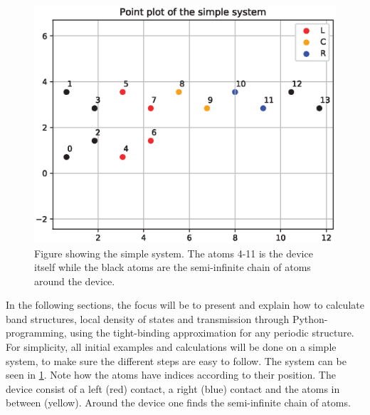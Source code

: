 \begin{figure}
	\vspace{-2em}
	\includegraphics[width=.45\textwidth]{Figures/pointplot.eps}
	\caption{Figure showing the simple system. The atoms 4-11 is the device itself while the black atoms are the semi-infinite chain of atoms around the device.}\label{inlinepointplot}
\end{figure}
In the following sections, the focus will be to present and explain how to calculate band structures, local density of states and transmission through Python-programming, using the tight-binding approximation for any periodic structure. For simplicity, all initial examples and calculations will be done on a simple system, to make sure the different steps are easy to follow. The system can be seen in \cref{inlinepointplot}. Note how the atoms have indices according to their position. The device consist of a left (red) contact, a right (blue) contact and the atoms in between (yellow). Around the device one finds the semi-infinite chain of atoms.
